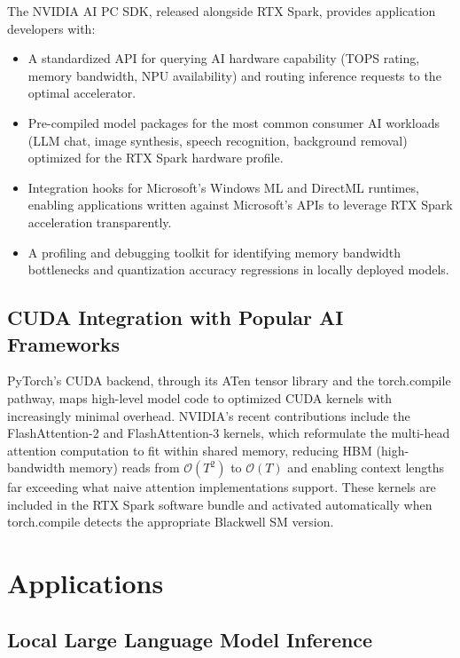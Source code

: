 \documentclass[conference]{IEEEtran}
\begin{document}
The NVIDIA AI PC SDK, released alongside RTX Spark, provides application developers with:

\begin{itemize}
    \item A standardized API for querying AI hardware capability (TOPS rating, memory bandwidth, NPU availability) and routing inference requests to the optimal accelerator.
    \item Pre-compiled model packages for the most common consumer AI workloads (LLM chat, image synthesis, speech recognition, background removal) optimized for the RTX Spark hardware profile.
    \item Integration hooks for Microsoft's Windows ML and DirectML runtimes, enabling applications written against Microsoft's APIs to leverage RTX Spark acceleration transparently.
    \item A profiling and debugging toolkit for identifying memory bandwidth bottlenecks and quantization accuracy regressions in locally deployed models.
\end{itemize}

\subsection{CUDA Integration with Popular AI Frameworks}

PyTorch's CUDA backend, through its ATen tensor library and the torch.compile pathway, maps high-level model code to optimized CUDA kernels with increasingly minimal overhead. NVIDIA's recent contributions include the FlashAttention-2 \cite{dao2023flashattention} and FlashAttention-3 kernels, which reformulate the multi-head attention computation to fit within shared memory, reducing HBM (high-bandwidth memory) reads from $\mathcal{O}(T^2)$ to $\mathcal{O}(T)$ and enabling context lengths far exceeding what naive attention implementations support. These kernels are included in the RTX Spark software bundle and activated automatically when torch.compile detects the appropriate Blackwell SM version.

\section{Applications}
\label{sec:applications}

\subsection{Local Large Language Model Inference}
\end{document}
